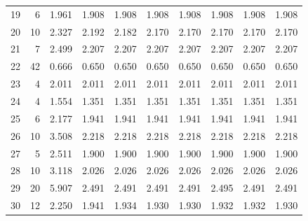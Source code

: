 \begin{longtable}{rrrrrrrrrr}
19 & 6 & 1.961 & 1.908 & 1.908 & 1.908 & 1.908 & 1.908 & 1.908 & 1.908 \\ 
20 & 10 & 2.327 & 2.192 & 2.182 & 2.170 & 2.170 & 2.170 & 2.170 & 2.170 \\ 
21 & 7 & 2.499 & 2.207 & 2.207 & 2.207 & 2.207 & 2.207 & 2.207 & 2.207 \\ 
22 & 42 & 0.666 & 0.650 & 0.650 & 0.650 & 0.650 & 0.650 & 0.650 & 0.650 \\ 
23 & 4 & 2.011 & 2.011 & 2.011 & 2.011 & 2.011 & 2.011 & 2.011 & 2.011 \\ 
24 & 4 & 1.554 & 1.351 & 1.351 & 1.351 & 1.351 & 1.351 & 1.351 & 1.351 \\ 
25 & 6 & 2.177 & 1.941 & 1.941 & 1.941 & 1.941 & 1.941 & 1.941 & 1.941 \\ 
26 & 10 & 3.508 & 2.218 & 2.218 & 2.218 & 2.218 & 2.218 & 2.218 & 2.218 \\ 
27 & 5 & 2.511 & 1.900 & 1.900 & 1.900 & 1.900 & 1.900 & 1.900 & 1.900 \\ 
28 & 10 & 3.118 & 2.026 & 2.026 & 2.026 & 2.026 & 2.026 & 2.026 & 2.026 \\ 
29 & 20 & 5.907 & 2.491 & 2.491 & 2.491 & 2.491 & 2.495 & 2.491 & 2.491 \\ 
30 & 12 & 2.250 & 1.941 & 1.934 & 1.930 & 1.930 & 1.932 & 1.932 & 1.930 \\ 
\bottomrule
\end{longtable}
